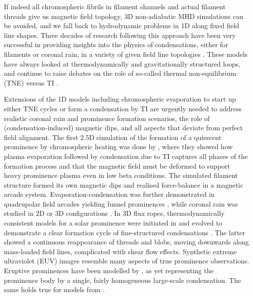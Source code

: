If indeed all chromospheric fibrils in filament channels and actual filament threads give us magnetic field topology, 3D non-adiabatic MHD simulations can be avoided, and we fall back to hydrodynamic problems in 1D along fixed field line shapes. Three decades of research following this approach have been very successful in providing insights into the physics of condensations, either for filaments or coronal rain, in a variety of given field line topologies \citep{mok1990,antiochos2000,luna2012,xia2011}. These models have always looked at thermodynamically and gravitationally structured loops, and continue to raise debates on the role of so-called thermal non-equilibrium (TNE) versus TI \citep{klimchuk2019,antolin2019}.

Extensions of the 1D models including chromospheric evaporation to start up either TNE cycles or form a condensation by TI are urgently needed to address realistic coronal rain and prominence formation scenarios, the role of (condensation-induced) magnetic dips, and all aspects that deviate from perfect field alignment. The first 2.5D simulation of the formation of a quiescent prominence by chromospheric heating was done by \citet{xia2012}, where they showed how plasma evaporation followed by condensation due to TI captures all phases of the formation process and that the magnetic field must be deformed to support heavy prominence plasma even in low beta conditions. The simulated filament structure formed its own magnetic dips and realised force-balance in a magnetic arcade system. Evaporation-condensation was further demonstrated in quadrupolar field arcades yielding funnel prominences \citep{keppens2014}, while coronal rain was studied in 2D \citep{fang2013,fang2015} or 3D configurations \citep{moschou2015, xia2017}. In 3D flux ropes, thermodynamically consistent models for a solar prominence were initiated in \citet{xia2014} and evolved to demonstrate a clear formation cycle of fine-structured condensations \citep{xia2016}. The latter showed a continuous reappearance of threads and blobs, moving downwards along mass-loaded field lines, complicated with shear flow effects. Synthetic extreme ultraviolet (EUV) images resemble many aspects of true prominence observations. Eruptive prominences have been modelled by \citet{fan2017}, as yet representing the prominence body by a single, fairly homogeneous large-scale condensation. The same holds true for models from \citet{kaneko2015}.

